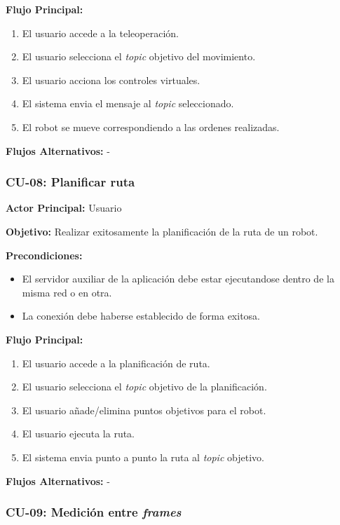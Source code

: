 \textbf{Flujo Principal:}
\begin{enumerate}
    \item El usuario accede a la teleoperación.
    \item El usuario selecciona el \textit{topic} objetivo del movimiento.
    \item El usuario acciona los controles virtuales.
    \item El sistema envia el mensaje al \textit{topic} seleccionado.
    \item El robot se mueve correspondiendo a las ordenes realizadas.
\end{enumerate}

\textbf{Flujos Alternativos:}
-

\subsubsection{CU-08: Planificar ruta}

\textbf{Actor Principal:} Usuario

\textbf{Objetivo:}
Realizar exitosamente la planificación de la ruta de un robot.

\textbf{Precondiciones:}
\begin{itemize}
    \item El servidor auxiliar de la aplicación debe estar ejecutandose dentro de la misma red o en otra. 
    \item La conexión debe haberse establecido de forma exitosa.
\end{itemize}

\textbf{Flujo Principal:}
\begin{enumerate}
    \item El usuario accede a la planificación de ruta.
    \item El usuario selecciona el \textit{topic} objetivo de la planificación.
    \item El usuario añade/elimina puntos objetivos para el robot.
    \item El usuario ejecuta la ruta.
    \item El sistema envia punto a punto la ruta al \textit{topic} objetivo.
\end{enumerate}

\textbf{Flujos Alternativos:}
-

\subsubsection{CU-09: Medición entre \textit{frames}}

